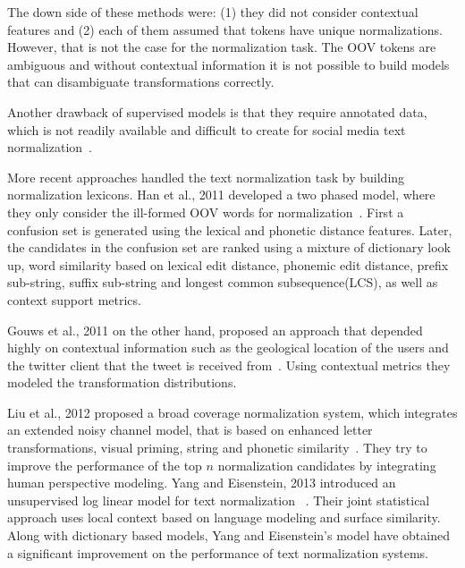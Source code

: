 \documentclass[a4paper,onesided,12pt]{report}
\begin{document}
The down side of these methods were: (1) they did not consider contextual features and (2) each of them assumed that tokens have unique normalizations. However, that is not the case for the normalization task. The OOV tokens are ambiguous and without contextual information it is not possible to build models that can disambiguate transformations correctly.

Another drawback of supervised models is that they require annotated data, which is not readily available and difficult to create for social media text normalization~\cite{DBLP:conf/emnlp/YangE13}.

More recent approaches handled the text normalization task by building normalization lexicons. Han et al., 2011 developed a two phased model, where they only consider the ill-formed OOV words for normalization~\cite{Han:2011:LNS:2002472.2002520}. First a confusion set is generated using the lexical and phonetic distance features. Later, the candidates in the confusion set are ranked using a mixture of dictionary look up, word similarity based on lexical edit distance, phonemic edit distance, prefix sub-string, suffix sub-string and longest common subsequence(LCS), as well as context support metrics.

Gouws et al., 2011 on the other hand, proposed an approach that depended highly on contextual information such as the geological location of the users and the twitter client that the tweet is received from~\cite{Gouws:2011:CBL:2021109.2021113}. Using contextual metrics they modeled the transformation distributions.

Liu et al., 2012 proposed a broad coverage normalization system, which integrates an extended noisy channel model, that is based on enhanced letter transformations, visual priming, string and phonetic similarity~\cite{liu2012broad}. They try to improve the performance of the top $n$ normalization candidates by integrating human perspective modeling.
Yang and Eisenstein, 2013 introduced an unsupervised log linear model for text normalization ~\cite{DBLP:conf/emnlp/YangE13}. Their joint statistical approach uses local context based on language modeling and surface similarity. Along with dictionary based models, Yang and Eisenstein's model have obtained a significant improvement on the performance of text normalization systems.
\end{document}
